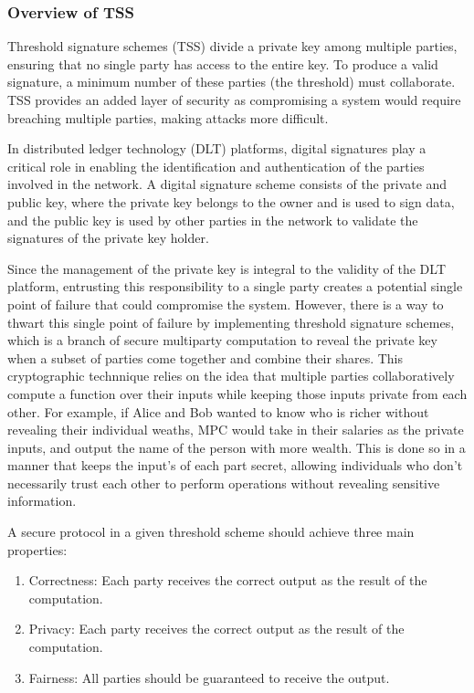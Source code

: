 \documentclass[12pt]{article}
\begin{document}
\subsubsection{Overview of TSS}
Threshold signature schemes (TSS) divide a private key among multiple parties, ensuring that no single party has access to the entire key. To produce a valid signature, a minimum number of these parties (the threshold) must collaborate. TSS provides an added layer of security as compromising a system would require breaching multiple parties, making attacks more difficult.

In distributed ledger technology (DLT) platforms, digital signatures play a critical role in enabling the identification and authentication of the parties involved in the network. A digital signature scheme consists of the private and public key, where the private key belongs to the owner and is used to sign data, and the public key is used by other parties in the network to validate the signatures of the private key holder. 

Since the management of the private key is integral to the validity of the DLT platform, entrusting this responsibility to a single party creates a potential single point of failure that could compromise the system. However, there is a way to thwart this single point of failure by implementing threshold signature schemes, which is a branch of secure multiparty computation to reveal the private key when a subset of parties come together and combine their shares. This cryptographic technnique relies on the idea that multiple parties collaboratively compute a function over their inputs while keeping those inputs private from each other. For example, if Alice and Bob wanted to know who is richer without revealing their individual weaths, MPC would take in their salaries as the private inputs, and output the name of the person with more wealth. This is done so in a manner that keeps the input's of each part secret, allowing individuals who don't necessarily trust each other to perform operations without revealing sensitive information.

A secure protocol in a given threshold scheme should achieve three main properties:
\begin{enumerate}
    \item Correctness: Each party receives the correct output as the result of the computation.
    \item Privacy: Each party receives the correct output as the result of the computation.
    \item Fairness: All parties should be guaranteed to receive the output.
\end{enumerate}
\end{document}
